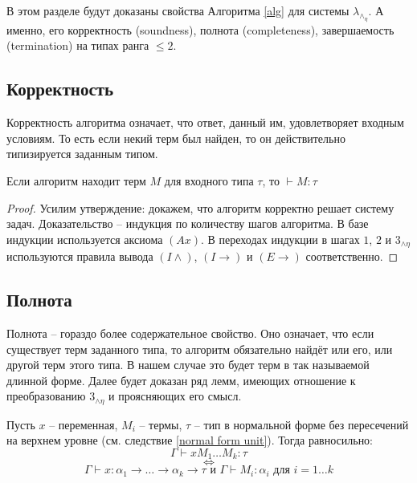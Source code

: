 \documentclass[../main.tex]{subfiles}
\begin{document}
В этом разделе будут доказаны свойства Алгоритма \ref{alg} для системы $\lambda_\wedge_\eta$. А именно, его корректность (soundness), полнота (completeness), завершаемость (termination) на типах ранга $\leqslant 2$.


\subsection{Корректность}

Корректность алгоритма означает, что ответ, данный им, удовлетворяет входным условиям. То есть если некий терм был найден, то он действительно типизируется заданным типом.

\begin{theorem}[Soundness]
Если алгоритм находит терм $M$ для входного типа $\tau$, то $\vdash M \colon \tau$
\end{theorem}
\begin{proof}
Усилим утверждение: докажем, что алгоритм корректно решает систему задач. Доказательство -- индукция по количеству шагов алгоритма. В базе индукции используется аксиома $(Ax)$. В переходах индукции в шагах $1$, $2$ и $3_{\wedge \eta}$ используются правила вывода $(I \wedge)$, $(I \to)$ и $(E \to)$ соответственно.
\end{proof}

\subsection{Полнота}

Полнота -- гораздо более содержательное свойство. Оно означает, что если существует терм заданного типа, то алгоритм обязательно найдёт или его, или другой терм этого типа. В нашем случае это будет терм в так называемой длинной форме.
Далее будет доказан ряд лемм, имеющих отношение к преобразованию $3_{\wedge \eta}$ и проясняющих его смысл. 

\begin{lemma} \label{необходимая типизация}

Пусть $x$ -- переменная, $M_i$ -- термы, $\tau$ -- тип в нормальной форме без пересечений на верхнем уровне (см. следствие \ref{normal form unit}). Тогда равносильно: 
    $$\Gamma \vdash x M_1 \dots M_k \colon \tau$$ 
    $$\iff$$
    $$\Gamma \vdash x \colon \alpha_1 \to \dots \to \alpha_k \to \tau \text{ и } \Gamma \vdash M_i \colon \alpha_i \text{ для } i = 1 \dots k$$
\end{lemma}
\end{document}
